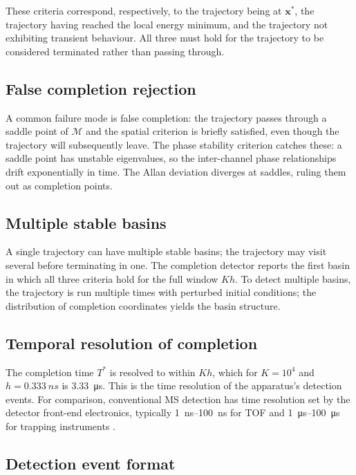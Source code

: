 \documentclass[twocolumn,11pt,a4paper]{article}
\theoremstyle{definition}
\theoremstyle{remark}
\newcommand{\Depth}{\mathcal{M}}
\begin{document}
These criteria correspond, respectively, to the trajectory being at $\mathbf{x}^\ast$, the trajectory having reached the local energy minimum, and the trajectory not exhibiting transient behaviour. All three must hold for the trajectory to be considered terminated rather than passing through.

\subsection{False completion rejection}

A common failure mode is false completion: the trajectory passes through a saddle point of $\Depth$ and the spatial criterion is briefly satisfied, even though the trajectory will subsequently leave. The phase stability criterion catches these: a saddle point has unstable eigenvalues, so the inter-channel phase relationships drift exponentially in time. The Allan deviation diverges at saddles, ruling them out as completion points.

\subsection{Multiple stable basins}

A single trajectory can have multiple stable basins; the trajectory may visit several before terminating in one. The completion detector reports the first basin in which all three criteria hold for the full window $K h$. To detect multiple basins, the trajectory is run multiple times with perturbed initial conditions; the distribution of completion coordinates yields the basin structure.

\subsection{Temporal resolution of completion}

The completion time $T^\ast$ is resolved to within $K h$, which for $K = 10^4$ and $h = \SI{0.333}{ns}$ is \SI{3.33}{\micro s}. This is the time resolution of the apparatus's detection events. For comparison, conventional MS detection has time resolution set by the detector front-end electronics, typically \SIrange{1}{100}{ns} for TOF and \SIrange{1}{100}{\micro s} for trapping instruments \citep{makarov2006}.

\subsection{Detection event format}
\end{document}
